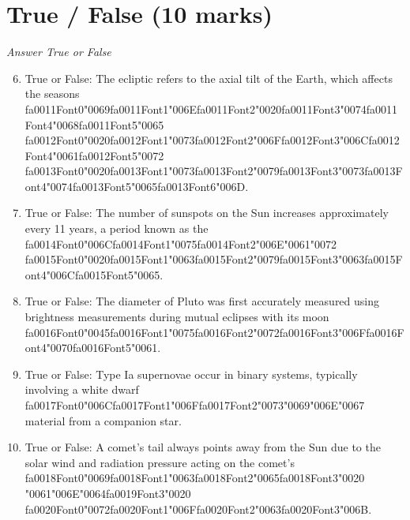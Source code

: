 \documentclass[12pt]{article}
\begin{document}
\section*{True / False (10 marks)}
\textit{Answer True or False}
\begin{enumerate}[label=\arabic*.]
\setcounter{enumi}{5}
\item True or False: The ecliptic refers to the axial tilt of the Earth, which affects the seasons {\csname fa0011Font0\endcsname\char"0069}{\csname fa0011Font1\endcsname\char"006E}{\csname fa0011Font2\endcsname\char"0020}{\csname fa0011Font3\endcsname\char"0074}{\csname fa0011Font4\endcsname\char"0068}{\csname fa0011Font5\endcsname\char"0065} {\csname fa0012Font0\endcsname\char"0020}{\csname fa0012Font1\endcsname\char"0073}{\csname fa0012Font2\endcsname\char"006F}{\csname fa0012Font3\endcsname\char"006C}{\csname fa0012Font4\endcsname\char"0061}{\csname fa0012Font5\endcsname\char"0072} {\csname fa0013Font0\endcsname\char"0020}{\csname fa0013Font1\endcsname\char"0073}{\csname fa0013Font2\endcsname\char"0079}{\csname fa0013Font3\endcsname\char"0073}{\csname fa0013Font4\endcsname\char"0074}{\csname fa0013Font5\endcsname\char"0065}{\csname fa0013Font6\endcsname\char"006D}.
\item True or False: The number of sunspots on the Sun increases approximately every 11 years, a period known as the {\csname fa0014Font0\endcsname\char"006C}{\csname fa0014Font1\endcsname\char"0075}{\csname fa0014Font2\endcsname\char"006E}{\char"0061}{\char"0072} {\csname fa0015Font0\endcsname\char"0020}{\csname fa0015Font1\endcsname\char"0063}{\csname fa0015Font2\endcsname\char"0079}{\csname fa0015Font3\endcsname\char"0063}{\csname fa0015Font4\endcsname\char"006C}{\csname fa0015Font5\endcsname\char"0065}.
\item True or False: The diameter of Pluto was first accurately measured using brightness measurements during mutual eclipses with its moon {\csname fa0016Font0\endcsname\char"0045}{\csname fa0016Font1\endcsname\char"0075}{\csname fa0016Font2\endcsname\char"0072}{\csname fa0016Font3\endcsname\char"006F}{\csname fa0016Font4\endcsname\char"0070}{\csname fa0016Font5\endcsname\char"0061}.
\item True or False: Type Ia supernovae occur in binary systems, typically involving a white dwarf {\csname fa0017Font0\endcsname\char"006C}{\csname fa0017Font1\endcsname\char"006F}{\csname fa0017Font2\endcsname\char"0073}{\char"0069}{\char"006E}{\char"0067} material from a companion star.
\item True or False: A comet's tail always points away from the Sun due to the solar wind and radiation pressure acting on the comet's {\csname fa0018Font0\endcsname\char"0069}{\csname fa0018Font1\endcsname\char"0063}{\csname fa0018Font2\endcsname\char"0065}{\csname fa0018Font3\endcsname\char"0020} {\char"0061}{\char"006E}{\char"0064}{\csname fa0019Font3\endcsname\char"0020} {\csname fa0020Font0\endcsname\char"0072}{\csname fa0020Font1\endcsname\char"006F}{\csname fa0020Font2\endcsname\char"0063}{\csname fa0020Font3\endcsname\char"006B}.
\end{enumerate}
\end{document}
